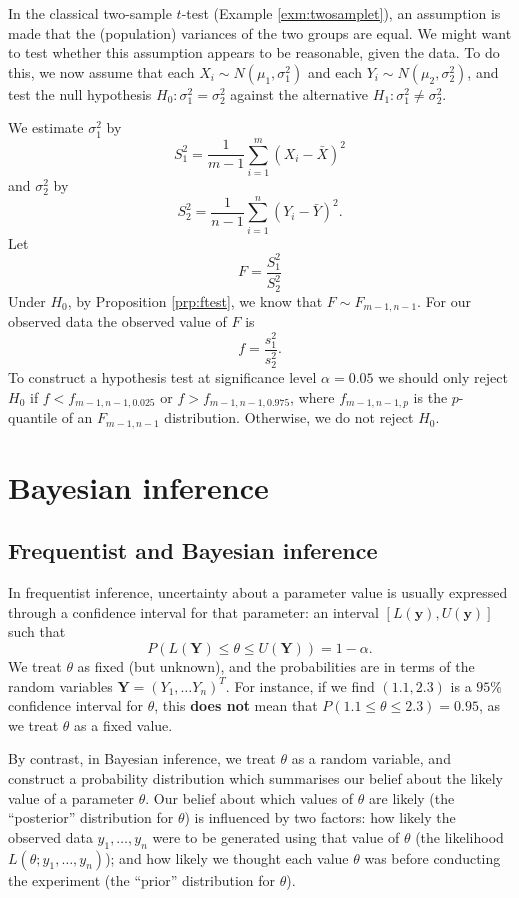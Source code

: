 \documentclass[]{book}
\theoremstyle{definition}
\theoremstyle{definition}
\theoremstyle{definition}
\theoremstyle{remark}
\let\BeginKnitrBlock\begin \let\EndKnitrBlock\end
\begin{document}
\BeginKnitrBlock{example}[$F$-test for equality of variances]
\protect\hypertarget{exm:unnamed-chunk-109}{}{\label{exm:unnamed-chunk-109}
\iffalse (\(F\)-test for equality of variances) \fi{} }In the classical
two-sample \(t\)-test (Example \ref{exm:twosamplet}), an assumption is
made that the (population) variances of the two groups are equal. We
might want to test whether this assumption appears to be reasonable,
given the data. To do this, we now assume that each
\(X_i \sim N(\mu_1, \sigma_1^2)\) and each
\(Y_i \sim N(\mu_2, \sigma_2^2)\), and test the null hypothesis
\(H_0: \sigma_1^2 = \sigma_2^2\) against the alternative
\(H_1: \sigma_1^2 \not = \sigma_2^2\).

We estimate \(\sigma_1^2\) by
\[S_1^2 = \frac{1}{m - 1} \sum_{i=1}^{m} (X_i - \bar X)^2\] and
\(\sigma_2^2\) by
\[S_2^2 = \frac{1}{n - 1} \sum_{i=1}^{n} (Y_i - \bar Y)^2.\] Let
\[F = \frac{S_1^2}{S_2^2}\] Under \(H_0\), by Proposition
\ref{prp:ftest}, we know that \(F \sim F_{m-1, n-1}.\) For our observed
data the observed value of \(F\) is \[f = \frac{s_1^2}{s_2^2}.\] To
construct a hypothesis test at significance level \(\alpha = 0.05\) we
should only reject \(H_0\) if \(f < f_{m-1, n-1, 0.025}\) or
\(f > f_{m-1, n-1, 0.975}\), where \(f_{m-1, n-1, p}\) is the
\(p\)-quantile of an \(F_{m-1, n-1}\) distribution. Otherwise, we do not
reject \(H_0\).
\EndKnitrBlock{example}

\chapter{Bayesian inference}\label{bayesian}

\section{Frequentist and Bayesian
inference}\label{frequentist-and-bayesian-inference}

In frequentist inference, uncertainty about a parameter value is usually
expressed through a confidence interval for that parameter: an interval
\([L(\bm y), U(\bm y)]\) such that
\[P(L(\bm Y) \leq \theta \leq U(\bm Y)) = 1- \alpha.\] We treat
\(\theta\) as fixed (but unknown), and the probabilities are in terms of
the random variables \(\bm Y = (Y_1, \ldots Y_n)^T\). For instance, if
we find \((1.1, 2.3)\) is a \(95 \%\) confidence interval for
\(\theta\), this \textbf{does not} mean that
\(P(1.1 \leq \theta \leq 2.3) = 0.95\), as we treat \(\theta\) as a
fixed value.

By contrast, in Bayesian inference, we treat \(\theta\) as a random
variable, and construct a probability distribution which summarises our
belief about the likely value of a parameter \(\theta\). Our belief
about which values of \(\theta\) are likely (the ``posterior''
distribution for \(\theta\)) is influenced by two factors: how likely
the observed data \(y_1, \ldots, y_n\) were to be generated using that
value of \(\theta\) (the likelihood \(L(\theta; y_1, \ldots, y_n)\));
and how likely we thought each value \(\theta\) was before conducting
the experiment (the ``prior'' distribution for \(\theta\)).
\end{document}
